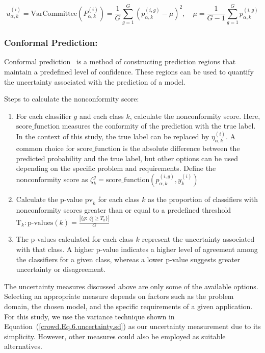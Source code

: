 \begin{equation}
    u_{\alpha,k}^{(i)} = \mathrm{VarCommittee}\left(P_{\alpha,k}^{(i)}\right) = \frac{1}{G}\sum_{g=1}^G {\left( p_{\alpha,k}^{(i,g)} - \mu \right)}^2 , \quad\mu= \frac{1}{G-1} \sum_{g=1}^G p_{\alpha,k}^{(i,g)}
    \label{crowd.Eq.8.uncertainty.committee_based}
\end{equation}

\subsubsection{Conformal Prediction:}

Conformal prediction~\cite{angelopoulos_Gentle_2021} is a method of constructing prediction regions that maintain a predefined level of confidence. These regions can be used to quantify the uncertainty associated with the prediction of a model.

Steps  to calculate the nonconformity score:
\begin{enumerate}
\item For each classifier $g $ and each class $k $, calculate the nonconformity score. Here, $\mathrm{score\_function}$ measures the conformity of the prediction with the true label. In the context of this study, the true label can be replaced by $\eta_{\alpha,k}^{(i)} $. A common choice for $\mathrm{score\_function}$ is the absolute difference between the predicted probability and the true label, but other options can be used depending on the specific problem and requirements. Define the nonconformity score as  $ \zeta_{k}^{g} = \mathrm{score\_function} \left(p_{\alpha,k}^{(i,g)}, y_k^{(i)}\right) $
\item Calculate the p-value $\mathrm{pv}_k $ for each class $k $ as the proportion of classifiers with nonconformity scores greater than or equal to a predefined threshold $\text{T}_k: \text{p-values}(k) = \frac{ \left\vert \{g: \;\zeta_{k}^{g} \geq T_k \} \right\vert} {G} $
\item The p-values calculated for each class $k $ represent the uncertainty associated with that class. A higher p-value indicates a higher level of agreement among the classifiers for a given class, whereas a lower p-value suggests greater uncertainty or disagreement.
\end{enumerate}

The uncertainty measures discussed above are only some of the available options. Selecting an appropriate measure depends on factors such as the problem domain, the chosen model, and the specific requirements of a given application. For this study, we use the variance technique shown in Equation~(\ref{crowd.Eq.6.uncertainty.sd}) as our uncertainty measurement due to its simplicity. However, other measures could also be employed as suitable alternatives.


